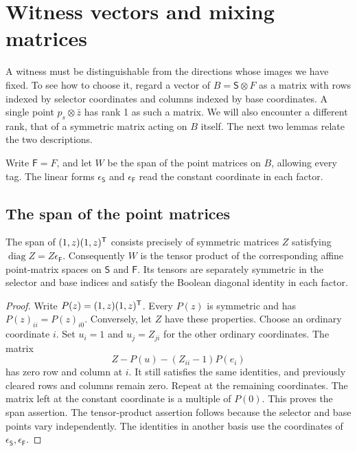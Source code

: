 \section{Witness vectors and mixing matrices}\label{sec:moments}

A witness must be distinguishable from the directions whose images we
have fixed. To see how to choose it, regard a vector of
\(B=\mathsf S\otimes F\) as a matrix with rows indexed by selector
coordinates and columns indexed by base coordinates. A single point
\(p_s\otimes\bar z\) has rank 1 as such a matrix. We will also encounter
a different rank, that of a symmetric matrix acting on \(B\) itself.
The next two lemmas relate the two descriptions.

Write \(\mathsf F=F\), and let \(W\) be the span of the point matrices
on \(B\), allowing every tag. The linear forms \(\epsilon_{\mathsf S}\)
and \(\epsilon_{\mathsf F}\) read the constant coordinate in each factor.

\subsection{The span of the point matrices}

\begin{lemma}\label{lem:base-moments}
The span of $(1,z)(1,z)^{\mathsf T}$ consists precisely of symmetric matrices
$Z$ satisfying $\operatorname{diag}Z=Z\epsilon_{\mathsf F}$.
Consequently $W$ is the tensor product of the corresponding affine
point-matrix spaces on $\mathsf S$ and $\mathsf F$. Its tensors are
separately symmetric in the selector and base indices and satisfy the
Boolean diagonal identity in each factor.
\end{lemma}
\begin{proof}
Write \(P(z)=(1,z)(1,z)^{\mathsf T}\). Every \(P(z)\) is symmetric and has
\(P(z)_{ii}=P(z)_{i0}\). Conversely, let \(Z\) have these properties.
Choose an ordinary coordinate \(i\). Set \(u_i=1\) and
\(u_j=Z_{ji}\) for the other ordinary coordinates. The matrix
\[
 Z-P(u)-(Z_{ii}-1)P(e_i)
\]
has zero row and column at \(i\). It still satisfies the same identities,
and previously cleared rows and columns remain zero. Repeat at the remaining
coordinates. The matrix left at the constant coordinate is a multiple of
\(P(0)\). This proves the span assertion.
The tensor-product assertion follows because the selector
and base points vary independently. The identities in another basis
use the coordinates of $\epsilon_{\mathsf S},\epsilon_{\mathsf F}$.
\end{proof}

